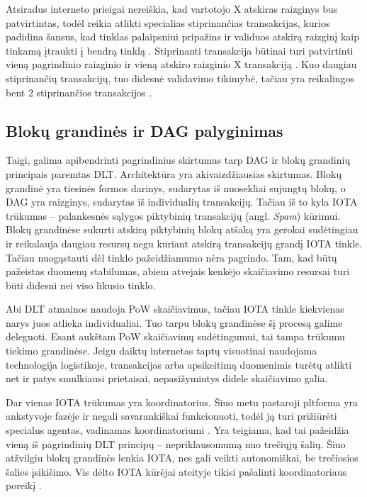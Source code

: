 Atsiradus interneto prieigai nereiškia, kad vartotojo X atskiras raizginys bus patvirtintas, todėl reikia atlikti specialias stiprinančias transakcijas, kurios padidina šansus, kad tinklas palaipsniui pripažins ir validuos atskirą raizginį kaip tinkamą įtraukti į bendrą tinklą \cite{bennet2017technical}. Stiprinanti transakcija būtinai turi patvirtinti vieną pagrindinio raizginio ir vieną atskiro raizginio X transakciją \cite{bennet2017technical}. Kuo daugiau stiprinančių transakcijų, tuo didesnė validavimo tikimybė, tačiau yra reikalingos bent 2 stiprinančios transakcijos \cite{bennet2017technical}.




\subsection{Blokų grandinės ir DAG palyginimas}

Taigi, galima apibendrinti pagrindinius skirtumus tarp DAG ir blokų grandinių principais paremtas DLT. Architektūra yra akivaizdžiausias skirtumas. Blokų grandinė yra tiesinės formos darinys, sudarytas iš nuosekliai sujungtų blokų, o DAG yra raizginys, sudarytas iš individualių transakcijų. Tačiau iš to kyla IOTA trūkumas – palankesnės sąlygos piktybinių transakcijų (angl. \textit{Spam}) kūrimui. Blokų grandinėse sukurti atskirą piktybinių blokų atšaką yra gerokai sudėtingiau ir reikalauja daugiau resursų negu kuriant atskirą transakcijų grandį IOTA tinkle. Tačiau nuogąstauti dėl tinklo pažeidžiamumo nėra pagrindo. Tam, kad būtų pažeistas duomenų stabilumas, abiem atvejais kenkėjo skaičiavimo resursai turi būti didesni nei viso likusio tinklo.

Abi DLT atmainos naudoja PoW skaičiavimus, tačiau IOTA tinkle kiekvienas narys juos atlieka individualiai. Tuo tarpu blokų grandinėse šį procesą galime deleguoti. Esant aukštam PoW skaičiavimų sudėtingumui, tai tampa trūkumu tiekimo grandinėse. Jeigu daiktų internetas taptų visuotinai naudojama technologija logistikoje, transakcijas arba apsikeitimą duomenimis turėtų atlikti net ir patys smulkiausi prietaisai, nepasižymintys didele skaičiavimo galia.

Dar vienas IOTA trūkumas yra koordinatorius. Šiuo metu pastaroji pltforma yra ankstyvoje fazėje ir negali savarankiškai funkcionuoti, todėl ją turi prižiūrėti specialus agentas, vadinamas koordinatoriumi \cite{bramas2018stability}. Yra teigiama, kad tai pažeidžia vieną iš pagrindinių DLT principų – nepriklausomumą nuo trečiųjų šalių. Šiuo atžvilgiu blokų grandinės lenkia IOTA, nes gali veikti autonomiškai, be trečiosios šalies įsikišimo. Vis dėlto IOTA kūrėjai ateityje tikisi pašalinti koordinatoriaus poreikį \cite{bramas2018stability}.

